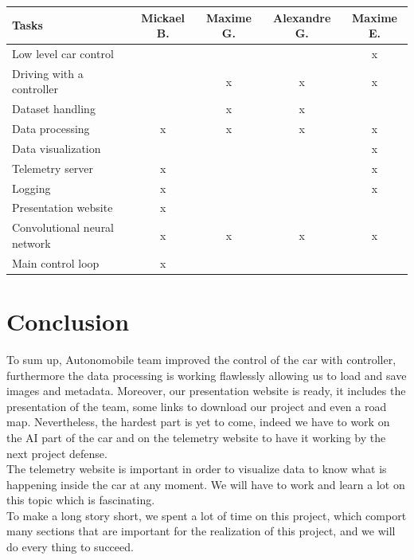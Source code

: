 \documentclass[12pt]{article}
\begin{document}
\begin{tabular}{|l|c|c|c|c|} 
\hline
Tasks                        & Mickael B. & Maxime G. & Alexandre G. & Maxime E.  \\ 
\hline
Low level car control        &            &           &              & x          \\ 
\hline
Driving with a controller    &            & x         & x            & x          \\ 
\hline
Dataset handling             &            & x         & x            &            \\ 
\hline
Data processing              & x          & x         & x            & x          \\ 
\hline
Data visualization           &            &           &              & x          \\ 
\hline
Telemetry server             & x          &           &              & x          \\ 
\hline
Logging                      & x          &           &              & x          \\ 
\hline
Presentation website         & x          &           &              &            \\ 
\hline
Convolutional neural network & x          & x         & x            & x          \\ 
\hline
Main control loop            & x          &           &              &            \\
\hline
\end{tabular}

\section {Conclusion}
To sum up, Autonomobile team improved the control of the car with controller, furthermore the data processing is working flawlessly allowing us to load and save images and metadata. Moreover, our presentation website is ready, it includes the presentation of the team, some links to download our project and even a road map. Nevertheless, the hardest part is yet to come, indeed we have to work on the AI part of the car and on the telemetry website to have it working by the next project defense.\\
The telemetry website is important in order to visualize data to know what is happening inside the car at any moment. We will have to work and learn a lot on this topic which is fascinating.\\

To make a long story short, we spent a lot of time on this project, which comport many sections that are important for the realization of this project, and we will do every thing to succeed. 
\end{document}
